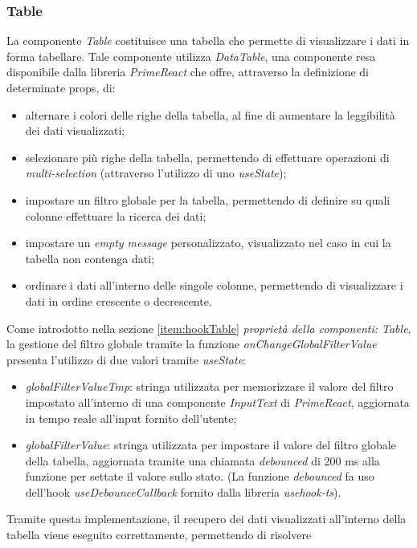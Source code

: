 \subsubsection{Table}
La componente \textit{Table} costituisce una tabella che permette di visualizzare i dati in forma tabellare. \newline
Tale componente utilizza \textit{DataTable}, una componente resa disponibile dalla libreria \textit{PrimeReact} che offre, attraverso
la definizione di determinate props, di:
\begin{itemize}
    \item alternare i colori delle righe della tabella, al fine di aumentare la leggibilità dei dati visualizzati;
    \item selezionare più righe della tabella, permettendo di effettuare operazioni di \textit{multi-selection} (attraverso
          l'utilizzo di uno \textit{useState});
    \item impostare un filtro globale per la tabella, permettendo di definire su quali colonne effettuare la ricerca dei dati;
    \item impostare un \textit{empty message} personalizzato, visualizzato nel caso in cui la tabella non contenga dati;
    \item ordinare i dati all'interno delle singole colonne, permettendo di visualizzare i dati in ordine crescente o decrescente.
\end{itemize}
Come introdotto nella sezione \ref{item:hookTable}{ \textit{proprietà della componenti: Table}}, la gestione del filtro globale tramite
la funzione \textit{onChangeGlobalFilterValue} presenta l'utilizzo di due valori tramite \textit{useState}:
\begin{itemize}
    \item \textit{globalFilterValueTmp}: stringa utilizzata per memorizzare il valore del filtro impostato all'interno di una
          componente \textit{InputText} di \textit{PrimeReact}, aggiornata in tempo reale all'input fornito dell'utente;
    \item \textit{globalFilterValue}: stringa utilizzata per impostare il valore del filtro globale della tabella, aggiornata
          tramite una chiamata \textit{debounced} di 200 ms alla funzione per settate il valore sullo stato. \newline
          (La funzione \textit{debounced} fa uso dell'hook \textit{useDebounceCallback} fornito dalla libreria \textit{usehook-ts}).
\end{itemize}
Tramite questa implementazione, il recupero dei dati visualizzati all'interno della tabella viene eseguito correttamente, permettendo di risolvere
